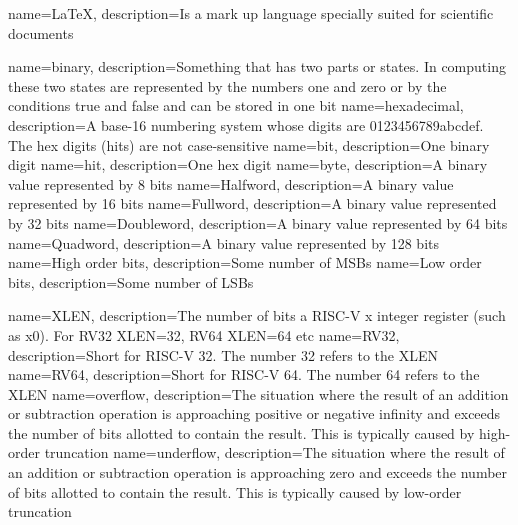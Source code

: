 {
    name=LaTeX,
    description={Is a mark up language specially suited
    for scientific documents}
}

{
	name=binary,
	description={Something that has two parts or states.  In computing
		these two states are represented by the numbers one and zero or
		by the conditions true and false and can be stored in one bit}
}
{
	name=hexadecimal,
	description={A base-16 numbering system whose digits are 
		0123456789abcdef.  The hex digits (hits) are not case-sensitive}
}
{
	name=bit,
	description={One binary digit}
}
{
	name={hit},
	description={One hex digit}
}
{
	name=byte,
	description={A binary value represented by 8 bits}
}
{
	name={Halfword},
	description={A binary value represented by 16 bits}
}
{
	name={Fullword},
	description={A binary value represented by 32 bits}
}
{
	name={Doubleword},
	description={A binary value represented by 64 bits}
}
{
	name={Quadword},
	description={A binary value represented by 128 bits}
}
{
	name={High order bits},
	description={Some number of MSBs}
}
{
    name={Low order bits},
    description={Some number of LSBs}
}

{
	name=XLEN,
	description={The number of bits a RISC-V x integer register 
		(such as x0).  For RV32 XLEN=32, RV64 XLEN=64 etc}
}
{
	name=RV32,
	description={Short for RISC-V 32.  The number 32 refers to the XLEN}
}
{
	name=RV64,
	description={Short for RISC-V 64.  The number 64 refers to the XLEN}
}
{
	name=overflow,
	description={The situation where the result of an addition or 
		subtraction operation is approaching positive or negative 
		infinity and exceeds the number of bits allotted to contain 
		the result.  This is typically caused by high-order truncation}
}
{
	name=underflow,
	description={The situation where the result of an addition or 
		subtraction operation is approaching zero and exceeds the number 
		of bits allotted to contain the result.  This is typically
        caused by low-order truncation}
}


